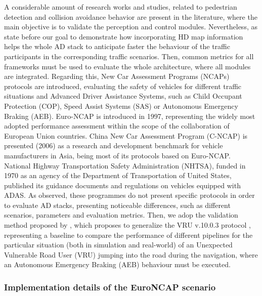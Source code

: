 A considerable amount of research works and studies, related to pedestrian detection and collision avoidance behavior are present in the literature, where the main objective is to validate the perception and control modules. Nevertheless, as state before our goal to demonstrate how incorporating HD map information helps the whole AD stack to anticipate faster the behaviour of the traffic participants in the corresponding traffic scenarios. Then, common metrics for all frameworks must be used to evaluate the whole architecture, where all modules are integrated. Regarding this, New Car Assessment Programs (NCAPs) protocols are introduced, evaluating the safety of vehicles for different traffic situations and Advanced Driver Assistance Systems, such as Child Occupant Protection (COP), Speed Assist Systems (SAS) or Autonomous Emergency Braking (AEB). Euro-NCAP \cite{article_EuroNCAP_2} is introduced in 1997, representing the widely most adopted performance assessment within the scope of the collaboration of European Union countries. China New Car Assessment Program (C-NCAP) \cite{article_CNCAP} is presented (2006) as a research and development benchmark for vehicle manufacturers in Asia, being most of its protocols based on Euro-NCAP. National Highway Transportation Safety Administration (NHTSA), funded in 1970 as an agency of the Department of Transportation of United States, published \cite{article_NHTSA} its guidance documents and regulations on vehicles equipped with ADAS. As observed, these programmes do not present specific protocols in order to evaluate AD stacks, presenting noticeable differences, such as different scenarios, parameters and evaluation metrics. Then, we adop the validation method proposed by \cite{gutierrez2021validation}, which proposes to generalize the VRU v.10.0.3 protocol \cite{web_VRU_assessment_protocol}, representing a baseline to compare the performance of different pipelines for the particular situation (both in simulation and real-world) of an Unexpected Vulnerable Road User (VRU) jumping into the road during the navigation, where an Autonomous Emergency Braking (AEB) behaviour must be executed. 

\subsubsection{Implementation details of the EuroNCAP scenario}
\label{sec:5_euroncap_implementation_details}

